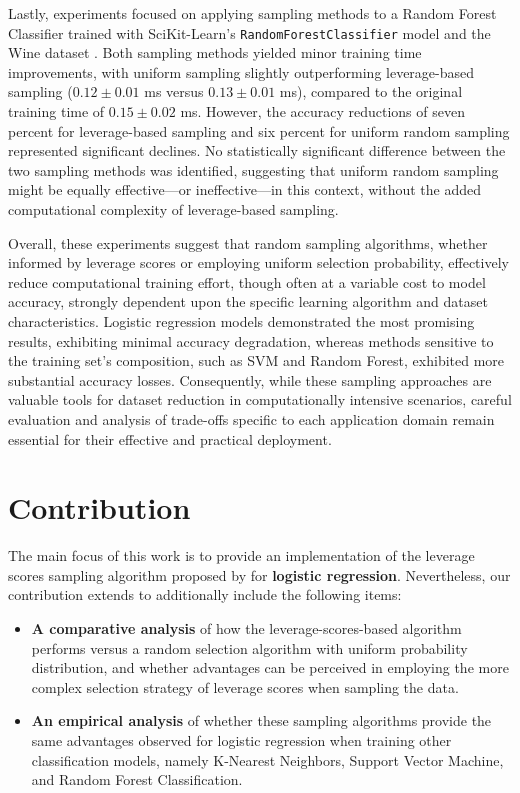 \documentclass{article}
\theoremstyle{plain}
\theoremstyle{definition}
\theoremstyle{remark}
\begin{document}
Lastly, experiments focused on applying sampling methods to a Random Forest Classifier trained with SciKit-Learn's \texttt{RandomForestClassifier} model and the Wine dataset \cite{wine}. Both sampling methods yielded minor training time improvements, with uniform sampling slightly outperforming leverage-based sampling ($0.12 \pm 0.01$ ms versus $0.13 \pm 0.01$ ms), compared to the original training time of $0.15 \pm 0.02$ ms. However, the accuracy reductions of seven percent for leverage-based sampling and six percent for uniform random sampling represented significant declines. No statistically significant difference between the two sampling methods was identified, suggesting that uniform random sampling might be equally effective—or ineffective—in this context, without the added computational complexity of leverage-based sampling.

Overall, these experiments suggest that random sampling algorithms, whether informed by leverage scores or employing uniform selection probability, effectively reduce computational training effort, though often at a variable cost to model accuracy, strongly dependent upon the specific learning algorithm and dataset characteristics. Logistic regression models demonstrated the most promising results, exhibiting minimal accuracy degradation, whereas methods sensitive to the training set's composition, such as SVM and Random Forest, exhibited more substantial accuracy losses. Consequently, while these sampling approaches are valuable tools for dataset reduction in computationally intensive scenarios, careful evaluation and analysis of trade-offs specific to each application domain remain essential for their effective and practical deployment.

\section{Contribution}

The main focus of this work is to provide an implementation of the leverage scores sampling algorithm proposed by \citet{chow24} for \textbf{logistic regression}. Nevertheless, our contribution extends to additionally include the following items:

\begin{itemize}
	\item \textbf{A comparative analysis} of how the leverage-scores-based algorithm performs versus a random selection algorithm with uniform probability distribution, and whether advantages can be perceived in employing the more complex selection strategy of leverage scores when sampling the data.
	
	\item \textbf{An empirical analysis} of whether these sampling algorithms provide the same advantages observed for logistic regression when training other classification models, namely K-Nearest Neighbors, Support Vector Machine, and Random Forest Classification.
\end{itemize}
\end{document}
